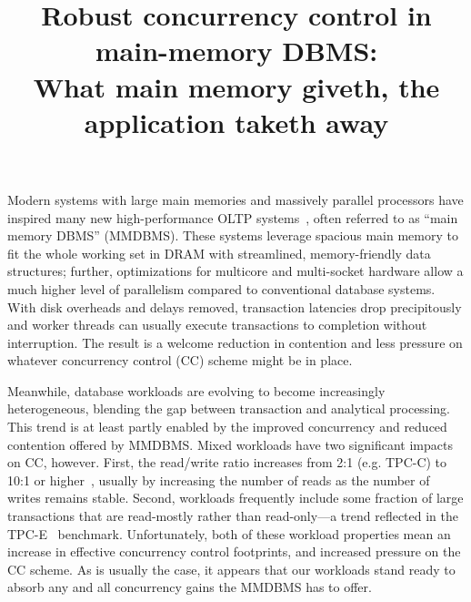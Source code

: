 \documentclass[preprint]{sig-alternate-nocprt}
\begin{document}

\title{Robust concurrency control in main-memory DBMS:\\What main memory giveth, the application taketh away}

\author{
\alignauthor
}

\maketitle

Modern systems with large main memories and massively parallel processors have inspired many new high-performance OLTP systems~\cite{HStore,Hyper,Hekaton,Silo}, often referred to as ``main memory DBMS'' (MMDBMS). These systems leverage spacious main memory to fit the whole working set in DRAM with streamlined, memory-friendly data structures; further, optimizations for multicore and multi-socket hardware allow a much higher level of parallelism compared to conventional database systems. With disk overheads and delays removed, transaction latencies drop precipitously and worker threads can usually execute transactions to completion without interruption. The result is a welcome reduction in contention and less pressure on whatever concurrency control (CC) scheme might be in place.

Meanwhile, database workloads are evolving to become increasingly heterogeneous, blending the gap between transaction and analytical processing. This trend is at least partly enabled by the improved concurrency and reduced contention offered by MMDBMS. Mixed workloads have two significant impacts on CC, however. First, the read/write ratio increases from 2:1 (e.g. TPC-C) to 10:1 or higher~\cite{TPC-Compare}, usually by increasing the number of reads as the number of writes remains stable. Second, workloads frequently include some fraction of large transactions that are read-mostly rather than read-only---a trend reflected in the TPC-E~\cite{TPC-E} benchmark. Unfortunately, both of these workload properties mean an increase in effective concurrency control footprints, and increased pressure on the CC scheme. As is usually the case, it appears that our workloads stand ready to absorb any and all concurrency gains the MMDBMS has to offer.
\end{document}
